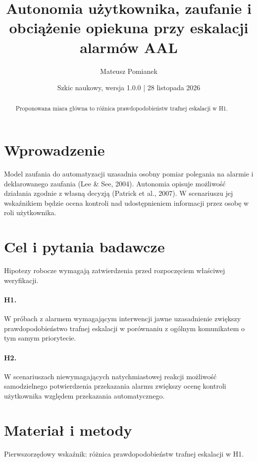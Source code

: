 \documentclass[11pt,a4paper]{article}
\title{Autonomia użytkownika, zaufanie i obciążenie opiekuna przy eskalacji alarmów AAL}
\author{Mateusz Pomianek}
\date{Szkic naukowy, wersja 1.0.0 | 28 listopada 2026}
\begin{document}
\maketitle

\begin{abstract}

Proponowana miara główna to różnica prawdopodobieństw trafnej eskalacji w H1.

\end{abstract}

\section{Wprowadzenie}

Model zaufania do automatyzacji uzasadnia osobny pomiar polegania na alarmie i deklarowanego zaufania (Lee \& See, 2004). Autonomia opisuje możliwość działania zgodnie z własną decyzją (Patrick et al., 2007). W scenariuszu jej wskaźnikiem będzie ocena kontroli nad udostępnieniem informacji przez osobę w roli użytkownika.

\section{Cel i pytania badawcze}

Hipotezy robocze wymagają zatwierdzenia przed rozpoczęciem właściwej weryfikacji.

\paragraph{H1.} W próbach z alarmem wymagającym interwencji jawne uzasadnienie zwiększy prawdopodobieństwo trafnej eskalacji w porównaniu z ogólnym komunikatem o tym samym priorytecie.

\paragraph{H2.} W scenariuszach niewymagających natychmiastowej reakcji możliwość samodzielnego potwierdzenia przekazania alarmu zwiększy ocenę kontroli użytkownika względem przekazania automatycznego.

\section{Materiał i metody}

Pierwszorzędowy wskaźnik: różnica prawdopodobieństw trafnej eskalacji w H1.
\end{document}
